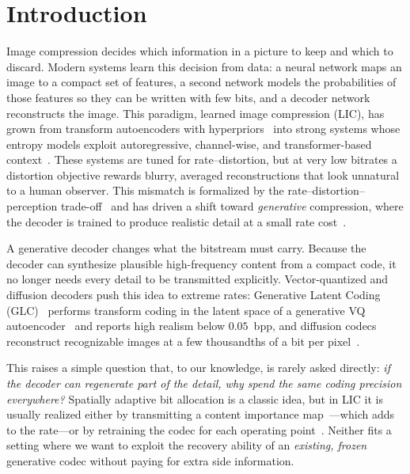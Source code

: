\documentclass[conference]{IEEEtran}
\begin{document}
\section{Introduction}
\label{sec:intro}
Image compression decides which information in a picture to keep and which to
discard. Modern systems learn this decision from data: a neural network maps an
image to a compact set of features, a second network models the probabilities of
those features so they can be written with few bits, and a decoder network
reconstructs the image. This paradigm, learned image compression (LIC), has grown
from transform autoencoders with hyperpriors~\cite{balle2017end,balle2018variational}
into strong systems whose entropy models exploit autoregressive, channel-wise, and
transformer-based context~\cite{minnen2018joint,minnen2020channel,cheng2020learned,he2022elic,liu2023tcm}.
These systems are tuned for rate--distortion, but at very low bitrates a
distortion objective rewards blurry, averaged reconstructions that look unnatural
to a human observer. This mismatch is formalized by the
rate--distortion--perception trade-off~\cite{blau2018perception,blau2019rethinking}
and has driven a shift toward \emph{generative} compression, where the decoder is
trained to produce realistic detail at a small rate cost~\cite{agustsson2019extreme,mentzer2020hific,muckley2023improving}.

A generative decoder changes what the bitstream must carry. Because the decoder
can synthesize plausible high-frequency content from a compact code, it no longer
needs every detail to be transmitted explicitly. Vector-quantized and diffusion
decoders push this idea to extreme rates: Generative Latent Coding
(GLC)~\cite{jia2024generative,qi2025generative} performs transform coding in the
latent space of a generative VQ autoencoder~\cite{esser2021taming} and reports
high realism below $0.05$~bpp, and diffusion codecs reconstruct recognizable
images at a few thousandths of a bit per pixel~\cite{yang2023lossy,careil2024towards}.

This raises a simple question that, to our knowledge, is rarely asked directly:
\emph{if the decoder can regenerate part of the detail, why spend the same
coding precision everywhere?} Spatially adaptive bit allocation is a classic
idea, but in LIC it is usually realized either by transmitting a content
importance map~\cite{li2018contentweighted}---which adds to the rate---or by
retraining the codec for each operating point~\cite{choi2019variable}. Neither
fits a setting where we want to exploit the recovery ability of an
\emph{existing, frozen} generative codec without paying for extra side
information.
\end{document}
